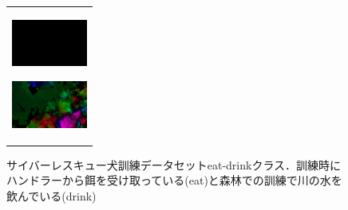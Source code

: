\begin{figure}[H]
\begin{tabular}{l}
      \begin{minipage}{0.165\hsize}
        \begin{center}
          \includegraphics[clip, width=2.5cm]{./Figures/optic_drink4.eps}
          \hspace{0.1cm} { }
        \end{center}
      \end{minipage}
      \begin{minipage}{0.165\hsize}
        \begin{center}
          \includegraphics[clip, width=2.5cm]{./Figures/optic_drink5.eps}
          \hspace{2.2cm} { }
        \end{center}
      \end{minipage}
    \end{tabular}
    \caption{サイバーレスキュー犬訓練データセットeat-drinkクラス．訓練時にハンドラーから餌を受け取っている(eat)と森林での訓練で川の水を飲んでいる(drink)}
    \label{eat-drink}
\end{figure}

